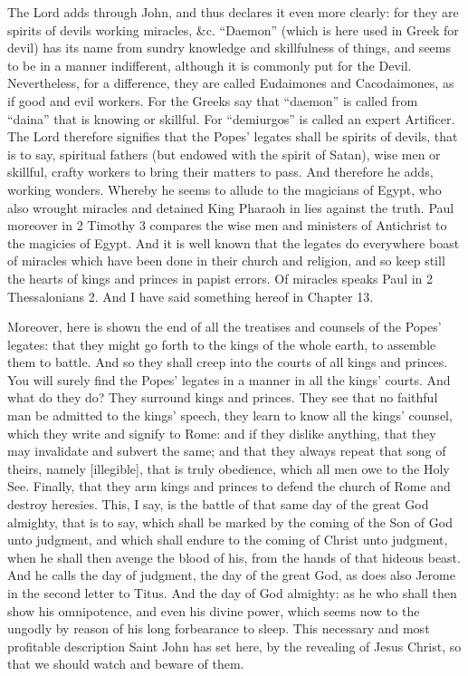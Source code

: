 The Lord adds through John, and thus declares it even more clearly: for they are spirits of devils working miracles, \&c. “Daemon” (which is here used in Greek for devil) has its name from sundry knowledge and skillfulness of things, and seems to be in a manner indifferent, although it is commonly put for the Devil. Nevertheless, for a difference, they are called Eudaimones and Cacodaimones, as if good and evil workers. For the Greeks say that “daemon” is called from “daina” that is knowing or skillful. For “demiurgos” is called an expert Artificer. The Lord therefore signifies that the Popes’ legates shall be spirits of devils, that is to say, spiritual fathers (but endowed with the spirit of Satan), wise men or skillful, crafty workers to bring their matters to pass. And therefore he adds, working wonders. Whereby he seems to allude to the magicians of Egypt, who also wrought miracles and detained King Pharaoh in lies against the truth. Paul moreover in 2 Timothy 3 compares the wise men and ministers of Antichrist to the magicies of Egypt. And it is well known that the legates do everywhere boast of miracles which have been done in their church and religion, and so keep still the hearts of kings and princes in papist errors. Of miracles speaks Paul in 2 Thessalonians 2. And I have said something hereof in Chapter 13.

Moreover, here is shown the end of all the treatises and counsels of the Popes’ legates: that they might go forth to the kings of the whole earth, to assemble them to battle. And so they shall creep into the courts of all kings and princes. You will surely find the Popes’ legates in a manner in all the kings’ courts. And what do they do? They surround kings and princes. They see that no faithful man be admitted to the kings’ speech, they learn to know all the kings’ counsel, which they write and signify to Rome: and if they dislike anything, that they may invalidate and subvert the same; and that they always repeat that song of theirs, namely [illegible], that is truly obedience, which all men owe to the Holy See. Finally, that they arm kings and princes to defend the church of Rome and destroy heresies. This, I say, is the battle of that same day of the great God almighty, that is to say, which shall be marked by the coming of the Son of God unto judgment, and which shall endure to the coming of Christ unto judgment, when he shall then avenge the blood of his, from the hands of that hideous beast. And he calls the day of judgment, the day of the great God, as does also Jerome in the second letter to Titus. And the day of God almighty: as he who shall then show his omnipotence, and even his divine power, which seems now to the ungodly by reason of his long forbearance to sleep. This necessary and most profitable description Saint John has set here, by the revealing of Jesus Christ, so that we should watch and beware of them.

